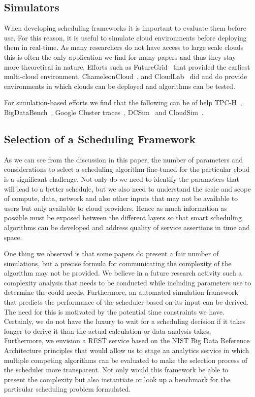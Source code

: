 \documentclass[final,5p,times,twocolumn]{elsarticle}
\begin{document}
\subsection{Simulators}
\label{sec:simulators}

When developing scheduling frameworks it is important to evaluate them before use. For this reason, it is useful to simulate cloud environments before deploying them in real-time. As many researchers do not have access to large scale clouds this is often the only application we find for many papers and thus they stay more theoretical in nature. Efforts such as FutureGrid~\cite{las12fg-bookchapter} that provided the earliest multi-cloud environment,
ChameleonCloud~\cite{Chameleoncloud2019}, and CloudLab~\cite{www-cloudlab} did and do provide environments in which clouds can be deployed and algorithms can be tested.

For simulation-based efforts we find that the following can be of help TPC-H~\cite{www-tpc-h}, BigDataBench~\cite{bigdatabench}, Google
Cluster traces~\cite{www-google-cluster-traces}, DCSim~\cite{www-dcsim}
and CloudSim~\cite{www-cloudsim}.

\subsection{Selection of a Scheduling Framework}

As we can see from the discussion in this paper, the number of parameters and considerations to select a scheduling algorithm fine-tuned for the particular cloud is a significant challenge.  Not only do we need to identify the parameters that will lead to a better schedule, but we also need to understand the scale and scope of compute, data, network and also other inputs that may not be available to users but only available to cloud providers. Hence as much information as possible must be exposed between the different layers so that smart scheduling algorithms can be developed and address quality of service assertions in time and space.

One thing we observed is that some papers do present a fair number of simulations, but a precise formula for communicating the complexity of the algorithm may not be provided. We believe in a future research activity such a complexity analysis that needs to be conducted while including parameters use to determine the could needs. Furthermore, an automated simulation framework that predicts the performance of the scheduler based on its input can be derived. The need for this is motivated by the potential time constraints we have. Certainly,  we do not have the luxury to wait for a scheduling decision if it takes longer to derive it than the actual calculation or data analysis takes. Furthermore, we envision a REST service based on the NIST Big Data Reference Architecture principles that would allow us to stage an analytics service in which multiple competing algorithms can be evaluated to make the selection process of the scheduler more transparent. Not only would this framework be able to present the complexity but also instantiate or look up a benchmark for the particular scheduling problem formulated.
\end{document}
